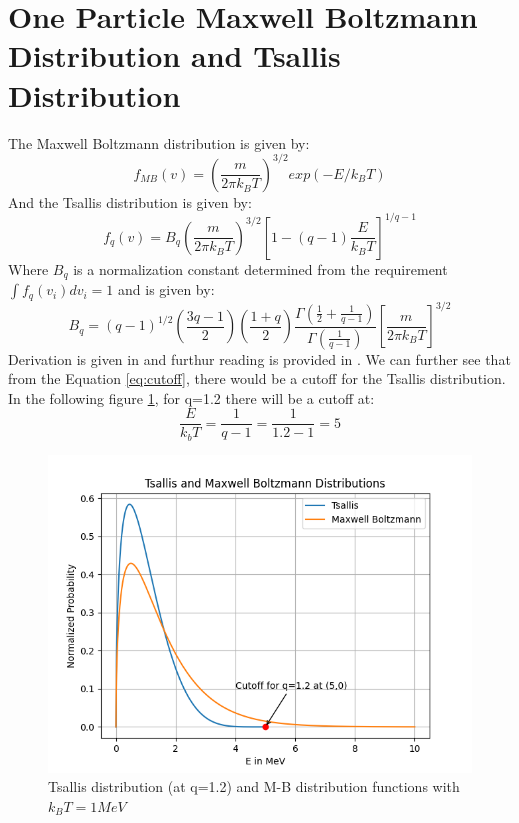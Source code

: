 \documentclass[11pt]{article}
\numberwithin{equation}{section}
\begin{document}
\section{One Particle Maxwell Boltzmann Distribution and Tsallis Distribution}
\label{section:5}
The Maxwell Boltzmann distribution is given by:
\begin{equation}
	f_{MB}(v)=\left(\frac{m}{2\pi k_{B}T}\right)^{3/2}exp\left(-E/k_{B}T\right) \label{eq:MB 1 particle}
\end{equation} 
And the Tsallis distribution is given by:
\begin{equation}
	f_{q}(v)=B_{q}\left(\frac{m}{2\pi k_{B}T}\right)^{3/2}\left[1-(q-1)\frac{E}{k_{B}T}\right]^{1/q-1}
\end{equation}
Where $B_{q}$ is a normalization constant determined from the requirement $\int f_{q}(v_{i})dv_{i}=1$ and is given by:
\begin{equation}
	B_{q	}=(q-1)^{1/2}\left(\frac{3q-1}{2}\right)\left(\frac{1+q}{2}\right)\frac{\Gamma(\frac{1}{2}+\frac{1}{q-1})}{\Gamma(\frac{1}{q-1})}\left[\frac{m}{2\pi k_{B}T}\right]^{3/2}
\end{equation}
Derivation is given in \cite{Silva:1998iy} and furthur reading is provided in \cite{Kusakabe:2018dzx}.
We can further see that from the Equation \eqref{eq:cutoff}, there would be a cutoff for the Tsallis distribution. In the following figure \ref{fig:tsallis and maxwell}, for q=1.2 there will be a cutoff at:
\begin{equation}
	\frac{E}{k_b T}=\frac{1}{q-1}=\frac{1}{1.2-1}=5
\end{equation}
\begin{figure}[H]
  \includegraphics[width=\linewidth]{"./Figures/tsallis and mb.png"}
  \caption{Tsallis distribution (at q=1.2) and M-B distribution functions with $k_{B}T=1MeV$}
  \label{fig:tsallis and maxwell}
\end{figure}
\end{document}
